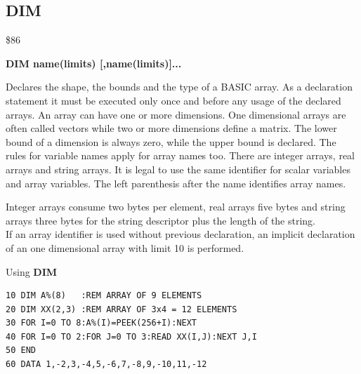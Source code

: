 
\newpage
\subsection{DIM}
\begin{description}[leftmargin=2cm,style=nextline]
\item [Token:] \$86
\item [Format:] {\bf DIM name(limits) [,name(limits)]...}
\item [Usage:] Declares the shape,
               the bounds and the type of a BASIC array.
               As a declaration statement it must be executed
               only once and before any usage of the declared arrays.
               An array can have one or more dimensions.
               One dimensional arrays are often called vectors
               while two or more dimensions define a matrix.
               The lower bound of a dimension is always zero,
               while the upper bound is declared. The rules for
               variable names apply for array names too.
               There are integer arrays, real arrays and string arrays.
               It is legal to use the same identifier for scalar
               variables and array variables. The left parenthesis
               after the name identifies array names.

\item [Remarks:] Integer arrays consume two bytes per element,
                 real arrays five bytes and string arrays three bytes
                 for the string descriptor plus
                 the length of the string. \\
                 If an array identifier is used without previous
                 declaration, an implicit declaration of an
                 one dimensional array with limit 10 is performed.

\item [Example:] Using {\bf DIM}
\begin{tcolorbox}[colback=black,coltext=white]
\verbatimfont{\codefont}
\begin{verbatim}
10 DIM A%(8)   :REM ARRAY OF 9 ELEMENTS
20 DIM XX(2,3) :REM ARRAY OF 3x4 = 12 ELEMENTS
30 FOR I=0 TO 8:A%(I)=PEEK(256+I):NEXT
40 FOR I=0 TO 2:FOR J=0 TO 3:READ XX(I,J):NEXT J,I
50 END
60 DATA 1,-2,3,-4,5,-6,7,-8,9,-10,11,-12
\end{verbatim}
\end{tcolorbox}
\end{description}

